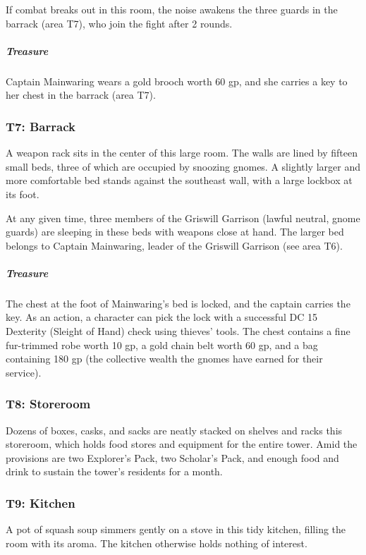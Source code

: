 \documentclass[10pt,a4paper,twoside,bg=print,twocolumn,openany,nodeprecatedcode]{dndbook}
\begin{document}
If combat breaks out in this room, the noise awakens the three guards in the barrack (area T7), who join the fight after 2 rounds.

\subparagraph{Treasure}
Captain Mainwaring wears a gold brooch worth 60 gp, and she carries a key to her chest in the barrack (area T7).

\subsubsection{T7: Barrack}
\begin{DndReadAloud}{}
A weapon rack sits in the center of this large room. The walls are lined by fifteen small beds, three of which are occupied by snoozing gnomes. A slightly larger and more comfortable bed stands against the southeast wall, with a large lockbox at its foot.

\end{DndReadAloud}

At any given time, three members of the Griswill Garrison (lawful neutral, gnome guards) are sleeping in these beds with weapons close at hand. The larger bed belongs to Captain Mainwaring, leader of the Griswill Garrison (see area T6).

\subparagraph{Treasure}
The chest at the foot of Mainwaring's bed is locked, and the captain carries the key. As an action, a character can pick the lock with a successful DC 15 Dexterity (Sleight of Hand) check using thieves' tools. The chest contains a fine fur-trimmed robe worth 10 gp, a gold chain belt worth 60 gp, and a bag containing 180 gp (the collective wealth the gnomes have earned for their service).

\subsubsection{T8: Storeroom}
Dozens of boxes, casks, and sacks are neatly stacked on shelves and racks this storeroom, which holds food stores and equipment for the entire tower. Amid the provisions are two Explorer's Pack, two Scholar's Pack, and enough food and drink to sustain the tower's residents for a month.

\subsubsection{T9: Kitchen}
A pot of squash soup simmers gently on a stove in this tidy kitchen, filling the room with its aroma. The kitchen otherwise holds nothing of interest.
\end{document}
